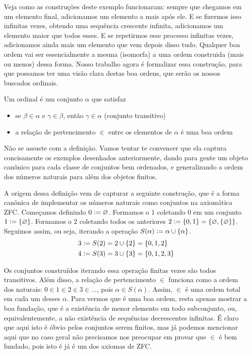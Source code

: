\documentclass[11pt]{article}
\newcommand{\defeq}{\vcentcolon=}
\theoremstyle{definition}
\theoremstyle{definition}
\theoremstyle{definition}
\theoremstyle{definition}
\theoremstyle{definition}
\theoremstyle{definition}
\theoremstyle{definition}
\theoremstyle{definition}
\newtheorem*{definition*}{Definição}
\newenvironment{definicao*}{
\definecolor{shadecolor}{HTML}{defcfc}
\begin{shaded}
\begin{definition*}
}
{
\end{definition*}
\end{shaded}
}
\theoremstyle{definition}
\theoremstyle{definition}
\theoremstyle{definition}
\theoremstyle{definition}
\theoremstyle{definition}
\begin{document}
Veja como as construções deste exemplo funcionaram: sempre que chegamos em um elemento final, adicionamos um elemento a mais após ele. E se fizermos isso infinitas vezes, obtendo uma sequência crescente infinita, adicionamos um elemento maior que todos esses. E se repetirmos esse processo infinitas vezes, adicionamos ainda mais um elemento que vem depois disso tudo. Qualquer boa ordem vai ser essencialmente a mesma (isomorfa) a uma ordem construida (mais ou menos) dessa forma. Nosso trabalho agora é formalizar essa construção, para que possamos ter uma visão clara destas boa ordens, que serão os nossos buscados ordinais.


\begin{definicao*}[Ordinais]
  Um ordinal é um conjunto $\alpha$ que satisfaz
  
  \begin{itemize}[label=]
    \item se $\beta \in \alpha$ e $\gamma \in \beta$, então $\gamma \in \alpha$ (conjunto transitivo)
    \item a relação de pertencimento $\in$ entre os elementos de $\alpha$ é uma boa ordem
  \end{itemize}
\end{definicao*}

Não se assuste com a definição. Vamos tentar te convencer que ela captura concisamente os exemplos desenhados anteriormente, dando para gente um objeto canônico para cada classe de conjuntos bem ordenados, e generalizando a ordem dos números naturais para além dos objetos finitos.

A origem dessa definição vem de capturar a seguinte construção, que é a forma canônica de implementar os números naturais como conjuntos na axiomática ZFC. Começamos definindo $0 \defeq \varnothing$. Formamos o $1$ coletando $0$ em um conjunto $1 \defeq \{\varnothing\}$. Formamos o $2$ coletando todos os anteriores $2 \defeq \{0,1\} = \{\varnothing, \{\varnothing\}\}$. Seguimos assim, ou seja, iterando a operação $S(\alpha) \defeq \alpha \cup \{\alpha\}$.
\begin{align*}
3 &\defeq S(2) = 2 \cup \{2\} =  \{0,1,2\} \\
4 &\defeq S(3) = 3 \cup \{3\} = \{0,1,2,3\}
\end{align*}

Os conjuntos construídos iterando essa operação finitas vezes são todos transitivos. Além disso, a relação de pertencimento $\in$ funciona como a ordem dos naturais: $0 \in 1 \in 2 \in 3 \in \dots$, pois $\alpha \in S(\alpha)$. Assim, $\in$ é uma ordem total em cada um desses $\alpha$. Para vermos que é uma boa ordem, resta apenas mostrar a boa fundação, que é a existência de menor elemento em todo subconjunto, ou, equivalentemente, a não existência de sequências decrescentes infinitas. É claro que aqui isto é óbvio pelos conjuntos serem finitos, mas já podemos mencionar aqui que no caso geral não precisamos nos preocupar em provar que $\in$ é bem fundado, pois isto é já é um dos axiomas de ZFC.
\end{document}

